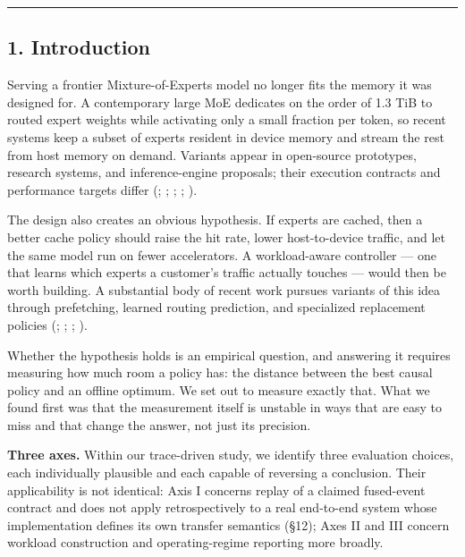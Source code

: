 \documentclass[
  10pt,
  letterpaper,
  10pt]{article}
\begin{document}
\begin{center}\rule{0.5\linewidth}{0.5pt}\end{center}

\subsection{1. Introduction}\label{introduction}

Serving a frontier Mixture-of-Experts model no longer fits the memory it
was designed for. A contemporary large MoE dedicates on the order of 1.3
TiB to routed expert weights while activating only a small fraction per
token, so recent systems keep a subset of experts resident in device
memory and stream the rest from host memory on demand. Variants appear
in open-source prototypes, research systems, and inference-engine
proposals; their execution contracts and performance targets differ
(;
;
;
;
).

The design also creates an obvious hypothesis. If experts are cached,
then a better cache policy should raise the hit rate, lower
host-to-device traffic, and let the same model run on fewer
accelerators. A workload-aware controller --- one that learns which
experts a customer's traffic actually touches --- would then be worth
building. A substantial body of recent work pursues variants of this
idea through prefetching, learned routing prediction, and specialized
replacement policies (;
;
;
).

Whether the hypothesis holds is an empirical question, and answering it
requires measuring how much room a policy has: the distance between the
best causal policy and an offline optimum. We set out to measure exactly
that. What we found first was that the measurement itself is unstable in
ways that are easy to miss and that change the answer, not just its
precision.

\textbf{Three axes.} Within our trace-driven study, we identify three
evaluation choices, each individually plausible and each capable of
reversing a conclusion. Their applicability is not identical: Axis I
concerns replay of a claimed fused-event contract and does not apply
retrospectively to a real end-to-end system whose implementation defines
its own transfer semantics (§12); Axes II and III concern workload
construction and operating-regime reporting more broadly.
\end{document}
